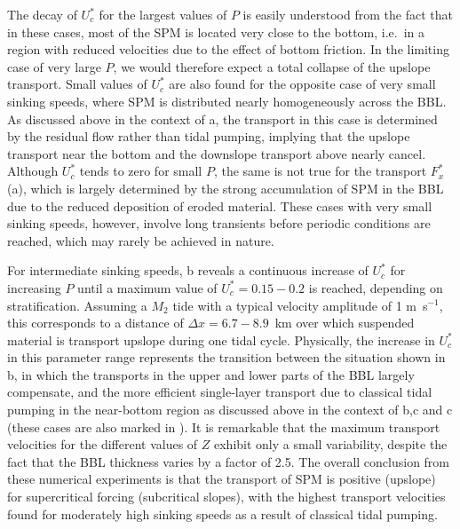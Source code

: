 The decay of $U_c^\ast$ for the largest values of $P$ is easily
understood from the fact that in these cases, most of the SPM is
located very close to the bottom, i.e.\ in a region with reduced
velocities due to the effect of bottom friction. In the limiting case
of very large $P$, we would therefore expect a total collapse of the
upslope transport. Small values of $U_c^\ast$ are also found for the
opposite case of very small sinking speeds, where SPM is distributed
nearly homogeneously across the BBL. As discussed above in the context
of a, the transport in this case is determined by the
residual flow rather than tidal pumping, implying that the upslope
transport near the bottom and the downslope transport above nearly
cancel. Although $U_c^\ast$ tends to zero for small $P$, the same is
not true for the transport $F_x^\ast$ (a), which is
largely determined by the strong accumulation of SPM in the BBL due to
the reduced deposition of eroded material. These cases with very small
sinking speeds, however, involve long transients before periodic
conditions are reached, which may rarely be achieved in nature.

For intermediate sinking speeds, b reveals a continuous
increase of $U_c^\ast$ for increasing $P$ until a maximum value of
$U_c^\ast = 0.15-0.2$ is reached, depending on
stratification. Assuming a $M_2$ tide with a typical velocity
amplitude of 1 m~s$^{-1}$, this corresponds to a distance of $\Delta x
= 6.7-8.9$~km over which suspended material is transport upslope
during one tidal cycle. Physically, the increase in $U_c^\ast$ in this
parameter range represents the transition between the situation shown
in b, in which the transports in the upper and lower
parts of the BBL largely compensate, and the more efficient
single-layer transport due to classical tidal pumping in the
near-bottom region as discussed above in the context of
b,c and c (these cases are also marked
in ). It is remarkable that the maximum transport
velocities for the different values of $Z$ exhibit only a small
variability, despite the fact that the BBL thickness varies by a
factor of 2.5. The overall conclusion from these numerical experiments
is that the transport of SPM is positive (upslope) for supercritical
forcing (subcritical slopes), with the highest transport velocities
found for moderately high sinking speeds as a result of classical
tidal pumping.

